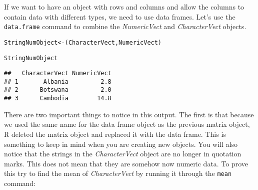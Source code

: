 
If we want to have an object with rows and columns and allow the columns to contain data with different types, we need to use data frames. Let's use the \texttt{data.frame} command to combine the {\emph{NumericVect}} and {\emph{CharacterVect}} objects.\label{data.frame}

\begin{knitrout}
\color{fgcolor}\begin{kframe}
\begin{alltt}
StringNumObject <- (CharacterVect, NumericVect)

StringNumObject
\end{alltt}
\begin{verbatim}
##   CharacterVect NumericVect
## 1       Albania         2.8
## 2      Botswana         2.0
## 3      Cambodia        14.8
\end{verbatim}
\end{kframe}
\end{knitrout}


\noindent There are two important things to notice in this output. The first is that because we used the same name for the data frame object as the previous matrix object, R deleted the matrix object and replaced it with the data frame. This is something to keep in mind when you are creating new objects. You will also notice that the strings in the {\emph{CharacterVect}} object are no longer in quotation marks. This does not mean that they are somehow now numeric data. To prove this try to find the mean of {\emph{CharacterVect}} by running it through the \texttt{mean} command:

\begin{knitrout}
\color{fgcolor}
\end{knitrout}


